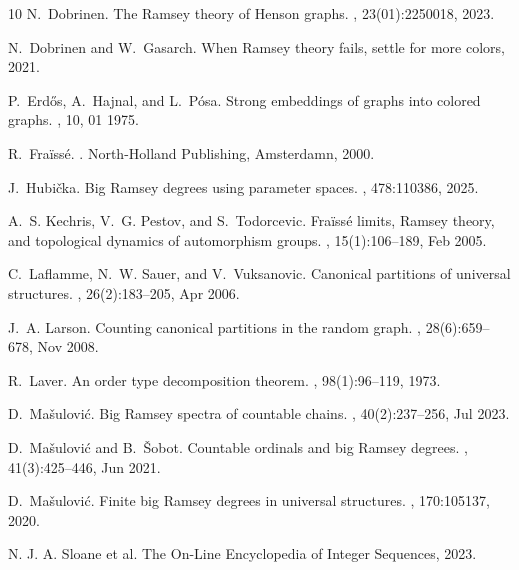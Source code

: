 \documentclass[11pt]{article}
\theoremstyle{plain}
\theoremstyle{definition}
\begin{document}
\begin{thebibliography}{10}
N.~Dobrinen.
\newblock The {R}amsey theory of {H}enson graphs.
, 23(01):2250018, 2023.

N.~Dobrinen and W.~Gasarch.
\newblock When {R}amsey theory fails, settle for more colors, 2021.

P.~Erdős, A.~Hajnal, and L.~Pósa.
\newblock Strong embeddings of graphs into colored graphs.
, 10, 01 1975.

R.~{Fra\"{i}ss\'{e}}.
.
\newblock North-Holland Publishing, Amsterdamn, 2000.

J.~Hubička.
\newblock Big {R}amsey degrees using parameter spaces.
, 478:110386, 2025.

A.~S. Kechris, V.~G. Pestov, and S.~Todorcevic.
\newblock Fra{\"i}ss{\'e} limits, {R}amsey theory, and topological dynamics of
  automorphism groups.
, 15(1):106--189, Feb
  2005.

C.~Laflamme, N.~W. Sauer, and V.~Vuksanovic.
\newblock Canonical partitions of universal structures.
, 26(2):183--205, Apr 2006.

J.~A. Larson.
\newblock Counting canonical partitions in the random graph.
, 28(6):659--678, Nov 2008.

R.~Laver.
\newblock An order type decomposition theorem.
, 98(1):96--119, 1973.

D.~Ma{\v{s}}ulovi{\'{c}}.
\newblock Big {R}amsey spectra of countable chains.
, 40(2):237--256, Jul 2023.

D.~Ma{\v{s}}ulovi{\'{c}} and B.~{\v{S}}obot.
\newblock Countable ordinals and big {R}amsey degrees.
, 41(3):425--446, Jun 2021.

D.~Mašulović.
\newblock Finite big {R}amsey degrees in universal structures.
, 170:105137, 2020.

{N. J. A. Sloane et al.}
\newblock The {On-Line Encyclopedia of Integer Sequences}, 2023.


\end{thebibliography}
\end{document}
